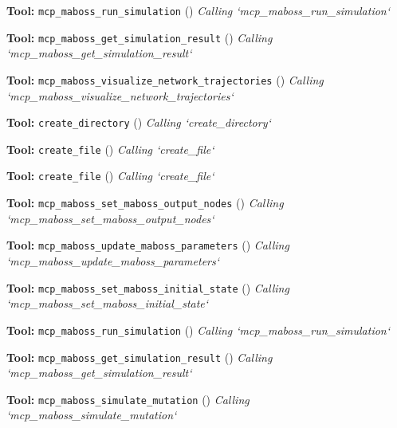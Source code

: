 \documentclass[11pt,a4paper]{article}
\begin{document}
\begin{toolokbox}
\textbf{Tool:} \texttt{mcp\_maboss\_run\_simulation} (\checkmark)
\textit{Calling `mcp\_maboss\_run\_simulation`}
\end{toolokbox}
\begin{toolokbox}
\textbf{Tool:} \texttt{mcp\_maboss\_get\_simulation\_result} (\checkmark)
\textit{Calling `mcp\_maboss\_get\_simulation\_result`}
\end{toolokbox}
\begin{toolokbox}
\textbf{Tool:} \texttt{mcp\_maboss\_visualize\_network\_trajectories} (\checkmark)
\textit{Calling `mcp\_maboss\_visualize\_network\_trajectories`}
\end{toolokbox}
\begin{toolokbox}
\textbf{Tool:} \texttt{create\_directory} (\checkmark)
\textit{Calling `create\_directory`}
\end{toolokbox}
\begin{toolokbox}
\textbf{Tool:} \texttt{create\_file} (\checkmark)
\textit{Calling `create\_file`}
\end{toolokbox}
\begin{toolokbox}
\textbf{Tool:} \texttt{create\_file} (\checkmark)
\textit{Calling `create\_file`}
\end{toolokbox}
\begin{toolokbox}
\textbf{Tool:} \texttt{mcp\_maboss\_set\_maboss\_output\_nodes} (\checkmark)
\textit{Calling `mcp\_maboss\_set\_maboss\_output\_nodes`}
\end{toolokbox}
\begin{toolokbox}
\textbf{Tool:} \texttt{mcp\_maboss\_update\_maboss\_parameters} (\checkmark)
\textit{Calling `mcp\_maboss\_update\_maboss\_parameters`}
\end{toolokbox}
\begin{toolokbox}
\textbf{Tool:} \texttt{mcp\_maboss\_set\_maboss\_initial\_state} (\checkmark)
\textit{Calling `mcp\_maboss\_set\_maboss\_initial\_state`}
\end{toolokbox}
\begin{toolokbox}
\textbf{Tool:} \texttt{mcp\_maboss\_run\_simulation} (\checkmark)
\textit{Calling `mcp\_maboss\_run\_simulation`}
\end{toolokbox}
\begin{toolokbox}
\textbf{Tool:} \texttt{mcp\_maboss\_get\_simulation\_result} (\checkmark)
\textit{Calling `mcp\_maboss\_get\_simulation\_result`}
\end{toolokbox}
\begin{toolokbox}
\textbf{Tool:} \texttt{mcp\_maboss\_simulate\_mutation} (\checkmark)
\textit{Calling `mcp\_maboss\_simulate\_mutation`}
\end{toolokbox}
\end{document}
